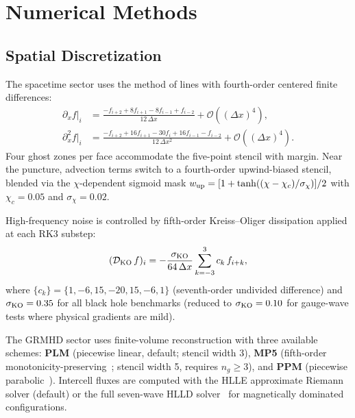 \documentclass[aps,prd,twocolumn,superscriptaddress,nofootinbib,showpacs,
               longbibliography]{revtex4-2}
\newcommand{\order}[1]{\mathcal{O}(#1)}
\begin{document}
\section{Numerical Methods}
\label{sec:numerics}

\subsection{Spatial Discretization}
\label{sec:fd}

The spacetime sector uses the method of lines with fourth-order centered
finite differences:
\begin{align}
  \partial_x f\big|_i &=
    \frac{-f_{i+2} + 8f_{i+1} - 8f_{i-1} + f_{i-2}}{12\,\Delta x}
    + \order{(\Delta x)^4}, \\
  \partial_x^2 f\big|_i &=
    \frac{-f_{i+2} + 16f_{i+1} - 30f_i + 16f_{i-1} - f_{i-2}}
         {12\,\Delta x^2}
    + \order{(\Delta x)^4}.
\end{align}
Four ghost zones per face accommodate the five-point stencil with margin.
Near the puncture, advection terms switch to a fourth-order upwind-biased
stencil, blended via the $\chi$-dependent sigmoid mask
$w_{\rm up} = [1 + \tanh((\chi - \chi_c)/\sigma_\chi)]/2$ with
$\chi_c = 0.05$ and $\sigma_\chi = 0.02$.

High-frequency noise is controlled by fifth-order Kreiss--Oliger dissipation
applied at each RK3 substep:
\begin{equation}
  (\mathcal{D}_{\rm KO}\,f)_i =
    -\frac{\sigma_{\rm KO}}{64\,\Delta x}\sum_{k=-3}^{3} c_k\,f_{i+k},
\end{equation}
where $\{c_k\} = \{1,-6,15,-20,15,-6,1\}$ (seventh-order undivided difference)
and $\sigma_{\rm KO} = 0.35$ for all black hole benchmarks
(reduced to $\sigma_{\rm KO} = 0.10$ for gauge-wave tests where physical
gradients are mild).

The GRMHD sector uses finite-volume reconstruction with three available
schemes:
\textbf{PLM} (piecewise linear, default; stencil width 3),
\textbf{MP5} (fifth-order monotonicity-preserving~\cite{SureshHuynh1997};
stencil width 5, requires $n_g \geq 3$), and
\textbf{PPM} (piecewise parabolic~\cite{ColellaWoodward1984}).
Intercell fluxes are computed with the HLLE approximate Riemann solver
(default) or the full seven-wave HLLD solver~\cite{MiyoshiKusano2005} for
magnetically dominated configurations.
\end{document}
